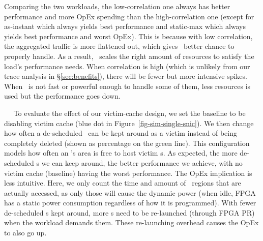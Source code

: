 Comparing the two workloads, the low-correlation one always has better performance and more OpEx spending than the high-correlation one (except for as-instant which always yields best performance and static-max which always yields best performance and worst OpEx).
This is because with low correlation, the aggregated traffic is more flattened out, which gives \snic\ better chance to properly handle. As a result, \snic\ scales the right amount of resources to satisfy the load's performance needs.
When correlation is high (which is unlikely from our trace analysis in \S\ref{sec:benefits}), there will be fewer but more intensive spikes. When \snic\ is not fast or powerful enough to handle some of them, less resources is used but the performance goes down.

~~
To evaluate the effect of our victim-cache design, we set the baseline to be disabling victim cache (blue dot in Figure~\ref{fig-sim-single-snic}).
We then change how often a de-scheduled \nt\ can be kept around as a victim instead of being completely deleted (shown as percentage on the green line). 
This configuration models how often an \snic's area is free to host victim \nt{}s.
As expected, the more de-scheduled \nt{}s we can keep around, the better performance we achieve, with no victim cache (baseline) having the worst performance.
The OpEx implication is less intuitive.
Here, we only count the time and amount of \nt\ regions that are actually accessed, as only those will cause the dynamic power (when idle, FPGA has a static power consumption regardless of how it is programmed).
With fewer de-scheduled \nt{}s kept around, more \nt{}s need to be re-launched (through FPGA PR) when the workload demands them. 
These re-launching overhead causes the OpEx to also go up.


